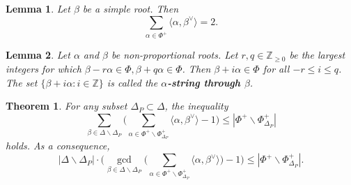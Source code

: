 \documentclass[10pt,a4paper]{amsart}
\newtheorem{theorem}{Theorem}
\newtheorem{lemma}{Lemma}
\newcommand{\Z}{\mathbb{Z}}
\begin{document}
\begin{lemma}\label{root sum lemma}
Let $\beta$ be a simple root. Then
\[
\sum_{\alpha\in \Phi^+}\langle \alpha, \beta^\vee \rangle=2.
\]
\end{lemma}

\begin{lemma}\label{lemma:string}
Let $\alpha$ and $\beta$ be non-proportional roots. Let $r, q\in
\Z_{\geq 0}$ be the largest integers for which $\beta-r\alpha\in \Phi,
\beta+q\alpha\in \Phi$. Then $\beta+i\alpha\in \Phi$ for all $-r\leq i\leq
q$. The set $\{\beta+i\alpha : i\in \Z\}$ is called the
\textbf{$\alpha$-string through $\beta$}.
\end{lemma}

\begin{theorem}
For any subset $\Delta_P \subset \Delta$, the inequality
\begin{equation}\label{strong inequality}
\sum_{\beta\in \Delta \smallsetminus \Delta_P}
\Biggl(
\sum_{\alpha\in \Phi^+\smallsetminus \Phi_{\Delta_P}^+}
\langle \alpha,\beta^\vee\rangle-1
\Biggr)
\leq |\Phi^+\smallsetminus \Phi_{\Delta_P}^+|
\end{equation}
holds. As a consequence,
\[
|\Delta \smallsetminus \Delta_P|\cdot
\Biggl(
\gcd_{\beta\in \Delta \smallsetminus \Delta_P}
\Biggl(
\sum_{\alpha\in \Phi^+\smallsetminus \Phi_{\Delta_P}^+}
\langle \alpha,\beta^\vee\rangle
\Biggr)
-1
\Biggr)
\le
|\Phi^+\smallsetminus \Phi_{\Delta_P}^+|.
\]
\end{theorem}
\end{document}
